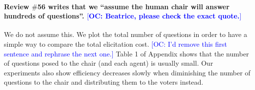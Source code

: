 \documentclass{article}
\newcommand{\commentOC}[1]{\textcolor{blue}{\small$\big[$OC: #1$\big]$}}
\begin{document}
\paragraph{Review $\#$56 writes that we “assume the human chair will answer hundreds of questions”. \commentOC{Beatrice, please check the exact quote.}}
We do not assume this. We plot the total number of questions in order to have a simple way to compare the total elicitation cost. 
\commentOC{I’d remove this first sentence and rephrase the next one.}
Table 1 of Appendix shows that the number of questions posed to the chair (and each agent) is usually small. Our experiments also show efficiency decreases slowly when diminishing the number of questions to the chair and distributing them to the voters instead.
\end{document}
